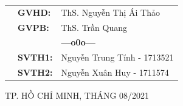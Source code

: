 \documentclass[a4paper,12pt,fleqn,print,oneside]{extarticle}
\begin{document}
\begin{titlepage}
\begin{table}[h]
\renewcommand{\arraystretch}{1.5}
\begin{tabular}{lll}
\hspace{5 cm}
& \textbf{{\large GVHD:}} & {\large ThS. Nguyễn Thị Ái Thảo} \\
& \textbf{{\large GVPB:}} & {\large ThS. Trần Quang}\\
&  & \textbf{---o0o---} \\
& \textbf{{\large SVTH1:}} & {\large Nguyễn Trung Tính - 1713521} \\
& \textbf{{\large SVTH2:}} & {\large Nguyễn Xuân Huy - 1711574} \\
\end{tabular}
\end{table}

\vspace{0.5cm}

\begin{center}
{\footnotesize {\large TP. HỒ CHÍ MINH, THÁNG 08/2021}}
\end{center}
\end{titlepage}

\end{document}
